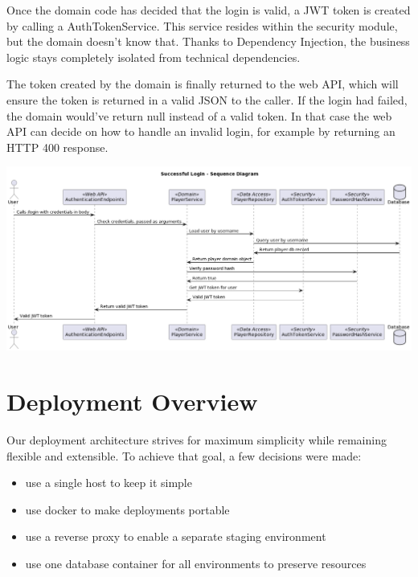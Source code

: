 Once the domain code has decided that the login is valid, a JWT token is created by calling a AuthTokenService.
This service resides within the security module, but the domain doesn't know that.
Thanks to Dependency Injection, the business logic stays completely isolated from technical dependencies.

The token created by the domain is finally returned to the web API, which will ensure the token is returned in a valid JSON to the caller.
If the login had failed, the domain would've return null instead of a valid token.
In that case the web API can decide on how to handle an invalid login, for example by returning an HTTP 400 response.

\includegraphics[width=\textwidth]{resources/diagrams/login-sequence}

\newpage

\section{Deployment Overview}
\label{sec:architecture_deployment}
Our deployment architecture strives for maximum simplicity while remaining flexible and extensible.
To achieve that goal, a few decisions were made:
\begin{itemize}
    \item use a single host to keep it simple
    \item use docker to make deployments portable
    \item use a reverse proxy to enable a separate staging environment
    \item use one database container for all environments to preserve resources
\end{itemize}

